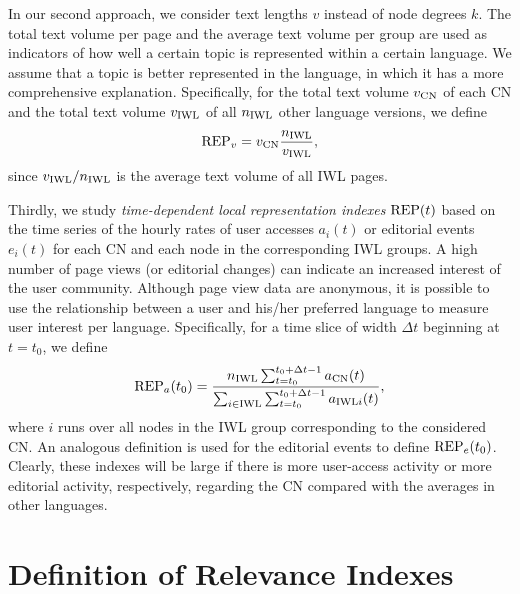 \documentclass[a4paper,10pt]{scrbook}
\begin{document}
In our second approach, we consider text lengths $v$ instead of node degrees $k$. The 
total text volume per page and the average text volume per group are used as 
indicators of how well a certain topic is represented within a certain language. 
We assume that a topic is better represented in the language, in which it has a 
more comprehensive explanation. Specifically, for the total text volume $v_{\rm 
CN}$ of each CN and the total text volume $v_{\rm IWL}$ of all $n_{\rm IWL}$ 
other language versions, we define
\begin{equation}
{\rm REP}_v = v_{\rm CN} \frac{n_{\rm IWL}}{ v_{\rm IWL}},
\label{EQ.REPv} 
\end{equation}
since $v_{\rm IWL} / n_{\rm IWL}$ is the average text volume of all IWL pages.

Thirdly, we study \textit{time-dependent local representation indexes} ${\rm 
REP}(t)$ based on the time series of the hourly rates of user accesses $a_i(t)$ 
or editorial events $e_i(t)$ for each CN and each node in the corresponding IWL 
groups. A high number of page views (or editorial changes) can indicate an 
increased interest of the user community. Although page view data are anonymous, 
it is possible to use the relationship between a user and his/her preferred 
language to measure user interest per language. Specifically, for a time slice 
of width $\Delta t$ beginning at $t=t_0$, we define
\begin{equation}
{\rm REP}_a(t_0) = {n_{\rm IWL} \sum_{t=t_0}^{t_0+\Delta t-1} a_{\rm CN}(t) \over 
\sum_{i \in {\rm IWL}} \sum_{t=t_0}^{t_0+\Delta t-1} a_{{\rm IWL} i}(t)},
\label{EQ.G.REPa}
\end{equation}
where $i$ runs over all nodes in the IWL group corresponding to the considered 
CN. An analogous definition is used for the editorial events to define ${\rm 
REP}_e(t_0)$. Clearly, these indexes will be large if there is more user-access 
activity or more editorial activity, respectively, regarding the CN compared 
with the averages in other languages. 



\section{Definition of Relevance Indexes}
\end{document}
